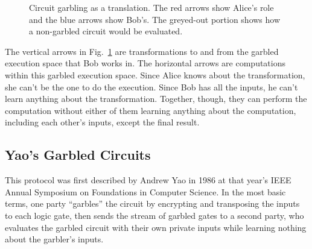 \begin{figure}[hb]
	\centering
	\caption{Circuit garbling as a translation. The red arrows show Alice's role and the blue arrows show Bob's. The greyed-out portion shows how a non-garbled circuit would be evaluated.}%
	\label{fig:garbling}
\end{figure}

The vertical arrows in Fig.~\ref{fig:garbling} are transformations to and from the garbled execution space that Bob works in. The horizontal arrows are computations within this garbled execution space. Since Alice knows about the transformation, she can't be the one to do the execution. Since Bob has all the inputs, he can't learn anything about the transformation. Together, though, they can perform the computation without either of them learning anything about the computation, including each other's inputs, except the final result.

\subsection{Yao's Garbled Circuits}
This protocol was first described by Andrew Yao in 1986 at that year's IEEE Annual Symposium on Foundations in Computer Science\cite{YaoGC}. In the most basic terms, one party ``garbles'' the circuit by encrypting and transposing the inputs to each logic gate, then sends the stream of garbled gates to a second party, who evaluates the garbled circuit with their own private inputs while learning nothing about the garbler's inputs.

